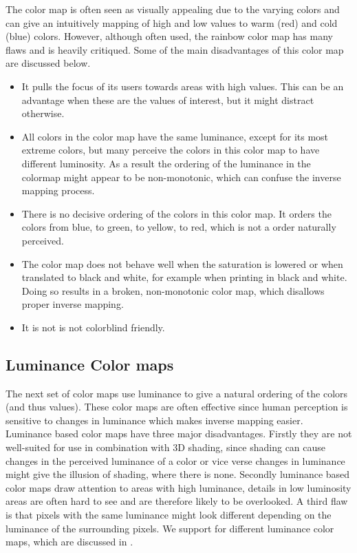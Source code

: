 The color map is often seen as visually appealing due to the varying colors and can give an intuitively mapping of high and low values to warm (red) and cold (blue) colors. However, although often used, the rainbow color map has many flaws and is heavily critiqued\cite{borland2007rainbow,divergingMoreland2009}. Some of the main disadvantages of this color map are discussed below.
\begin{itemize}
  \item It pulls the focus of its users towards areas with high values. This can be an advantage when these are the values of interest, but it might distract otherwise.
  \item All colors in the color map have the same luminance, except for its most extreme colors, but many perceive the colors in this color map to have different luminosity. As a result the ordering of the luminance in the colormap might appear to be non-monotonic, which can confuse the inverse mapping process.
  \item There is no decisive ordering of the colors in this color map. It orders the colors from blue, to green, to yellow, to red, which is not a order naturally perceived.
  \item The color map does not behave well when the saturation is lowered or when translated to black and white, for example when printing in black and white. Doing so results in a broken, non-monotonic color map, which disallows proper inverse mapping.
  \item It is not is not colorblind friendly.
\end{itemize}



\subsection{Luminance Color maps} %
\label{sub:luminance_colormaps}
The next set of color maps use luminance to give a natural ordering of the colors (and thus values). These color maps are often effective since human perception is sensitive to changes in luminance\cite{divergingMoreland2009} which makes inverse mapping easier. Luminance based color maps have three major disadvantages. Firstly they are not well-suited for use in combination with 3D shading, since shading can cause changes in the perceived luminance of a color or vice verse changes in luminance might give the illusion of shading, where there is none. Secondly luminance based color maps draw attention to areas with high luminance, details in low luminosity areas are often hard to see and are therefore likely to be overlooked. A third flaw is that pixels with the same luminance might look different depending on the luminance of the surrounding pixels. We support for different luminance color maps, which are discussed in .

